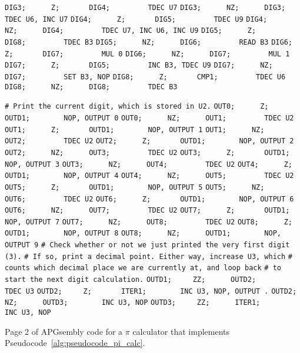 \begin{apgsembly}
\begin{minipage}[t]{.49\textwidth}
\begin{algorithmic}
			\State \verb|DIG3;      Z;       DIG4;         TDEC U7|
			\State \verb|DIG3;      NZ;      DIG3;         TDEC U6, INC U7|
			\State \verb|DIG4;      Z;       DIG5;         TDEC U9|
			\State \verb|DIG4;      NZ;      DIG4;         TDEC U7, INC U6, INC U9|
			\State \verb|DIG5;      Z;       DIG8;         TDEC B3|
			\State \verb|DIG5;      NZ;      DIG6;         READ B3|
			\State \verb|DIG6;      Z;       DIG7;         MUL 0|
			\State \verb|DIG6;      NZ;      DIG7;         MUL 1|
			\State \verb|DIG7;      Z;       DIG5;         INC B3, TDEC U9|
			\State \verb|DIG7;      NZ;      DIG7;         SET B3, NOP|
			\State \verb|DIG8;      Z;       CMP1;         TDEC U6|
			\State \verb|DIG8;      NZ;      DIG8;         TDEC B3|
		\end{algorithmic}
	\end{minipage}\hfill{\color{gray}\vline}\hfill
	\begin{minipage}[t]{.49\textwidth}
		\begin{algorithmic}\tiny
			\State \verb|# Print the current digit, which is stored in U2.|
			\State \verb|OUT0;      Z;       OUTD1;        NOP, OUTPUT 0|
			\State \verb|OUT0;      NZ;      OUT1;         TDEC U2|
			\State \verb|OUT1;      Z;       OUTD1;        NOP, OUTPUT 1|
			\State \verb|OUT1;      NZ;      OUT2;         TDEC U2|
			\State \verb|OUT2;      Z;       OUTD1;        NOP, OUTPUT 2|
			\State \verb|OUT2;      NZ;      OUT3;         TDEC U2|
			\State \verb|OUT3;      Z;       OUTD1;        NOP, OUTPUT 3|
			\State \verb|OUT3;      NZ;      OUT4;         TDEC U2|
			\State \verb|OUT4;      Z;       OUTD1;        NOP, OUTPUT 4|
			\State \verb|OUT4;      NZ;      OUT5;         TDEC U2|
			\State \verb|OUT5;      Z;       OUTD1;        NOP, OUTPUT 5|
			\State \verb|OUT5;      NZ;      OUT6;         TDEC U2|
			\State \verb|OUT6;      Z;       OUTD1;        NOP, OUTPUT 6|
			\State \verb|OUT6;      NZ;      OUT7;         TDEC U2|
			\State \verb|OUT7;      Z;       OUTD1;        NOP, OUTPUT 7|
			\State \verb|OUT7;      NZ;      OUT8;         TDEC U2|
			\State \verb|OUT8;      Z;       OUTD1;        NOP, OUTPUT 8|
			\State \verb|OUT8;      NZ;      OUTD1;        NOP, OUTPUT 9|
			\State \verb||
			\State \verb|# Check whether or not we just printed the very first digit (3).|
			\State \verb|# If so, print a decimal point. Either way, increase U3, which|
			\State \verb|# counts which decimal place we are currently at, and loop back|
			\State \verb|# to start the next digit calculation.|
			\State \verb|OUTD1;     ZZ;      OUTD2;        TDEC U3|
			\State \verb|OUTD2;     Z;       ITER1;        INC U3, NOP, OUTPUT .|
			\State \verb|OUTD2;     NZ;      OUTD3;        INC U3, NOP|
			\State \verb|OUTD3;     ZZ;      ITER1;        INC U3, NOP|
		\end{algorithmic}
	\end{minipage}
	\caption{Page 2 of APGsembly code for a $\pi$ calculator that implements Pseudocode~\ref{alg:pseudocode_pi_calc}.}\label{alg:apgsembly_pi2}
\end{apgsembly}